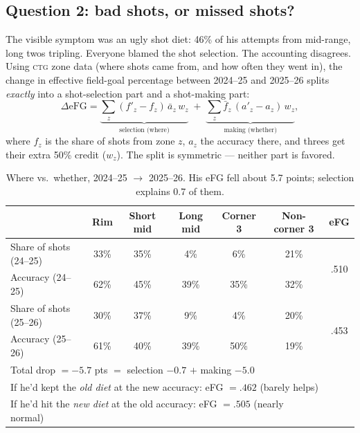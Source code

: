 \documentclass[11pt]{article}
\newcommand{\ctg}{\textsc{ctg}}
\begin{document}
\subsection{Question 2: bad shots, or missed shots?}
\label{sec:mixmake}

The visible symptom was an ugly shot diet: 46\% of his attempts from mid-range, long twos
tripling. Everyone blamed the shot selection. The accounting disagrees. Using \ctg{} zone
data (where shots came from, and how often they went in), the change in effective
field-goal percentage between 2024--25 and 2025--26 splits \emph{exactly} into a
shot-selection part and a shot-making part:
\begin{equation}
\Delta \mathrm{eFG}
= \underbrace{\textstyle\sum_z (f'_z - f_z)\, \bar{a}_z\, w_z}_{\text{selection (where)}}
\;+\;
\underbrace{\textstyle\sum_z \bar{f}_z\, (a'_z - a_z)\, w_z}_{\text{making (whether)}},
\label{eq:shapley}
\end{equation}
where $f_z$ is the share of shots from zone $z$, $a_z$ the accuracy there, and threes get
their extra 50\% credit ($w_z$). The split is symmetric --- neither part is favored.

\begin{table}[h]
\centering\small
\caption{Where vs.\ whether, 2024--25 $\to$ 2025--26. His eFG fell about 5.7 points;
selection explains 0.7 of them.}
\begin{tabular}{lccccc|c}
\toprule
 & Rim & Short mid & Long mid & Corner 3 & Non-corner 3 & eFG \\
\midrule
Share of shots (24--25) & 33\% & 35\% & 4\% & 6\% & 21\% & \multirow{2}{*}{.510} \\
Accuracy (24--25) & 62\% & 45\% & 39\% & 35\% & 32\% & \\
\midrule
Share of shots (25--26) & 30\% & 37\% & 9\% & 4\% & 20\% & \multirow{2}{*}{.453} \\
Accuracy (25--26) & 61\% & 40\% & 39\% & 50\% & 19\% & \\
\midrule
\multicolumn{6}{l}{Total drop $= -5.7$ pts $=$ selection $\mathbf{-0.7}$ $+$ making $\mathbf{-5.0}$} & \\
\multicolumn{6}{l}{If he'd kept the \emph{old diet} at the new accuracy: eFG $= .462$ (barely helps)} & \\
\multicolumn{6}{l}{If he'd hit the \emph{new diet} at the old accuracy: eFG $= .505$ (nearly normal)} & \\
\bottomrule
\end{tabular}
\label{tab:mixmake}
\end{table}
\end{document}
